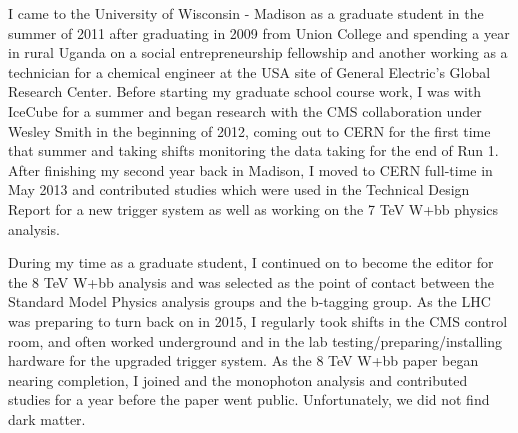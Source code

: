 \documentclass[10pt]{article} %
\begin{document}
\vspace{5pt}

I came to the University of Wisconsin - Madison as a graduate student in the summer of 2011 after graduating in 2009 from Union College and spending a year in rural Uganda on a social entrepreneurship fellowship and another working as a technician for a chemical engineer at the USA site of General Electric's Global Research Center. Before starting my graduate school course work, I was with IceCube for a summer and began research with the CMS collaboration under Wesley Smith in the beginning of 2012, coming out to CERN for the first time that summer and taking shifts monitoring the data taking for the end of Run 1. After finishing my second year back in Madison, I moved to CERN full-time in May 2013 and contributed studies which were used in the Technical Design Report for a new trigger system as well as working on the 7 TeV W+bb physics analysis.

During my time as a graduate student, I continued on to become the editor for the 8 TeV W+bb analysis and was selected as the point of contact between the Standard Model Physics analysis groups and the b-tagging group. As the LHC was preparing to turn back on in 2015, I regularly took shifts in the CMS control room, and often worked underground and in the lab testing/preparing/installing hardware for the upgraded trigger system. As the 8 TeV W+bb paper began nearing completion, I joined and the monophoton analysis and contributed studies for a year before the paper went public. Unfortunately, we did not find dark matter. 
\end{document}
